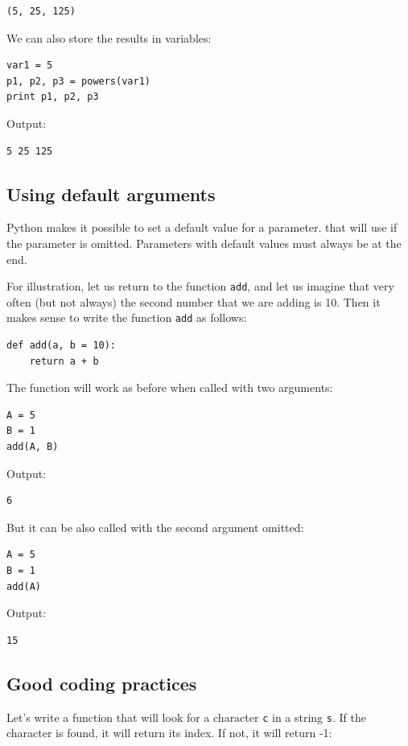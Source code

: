 \begin{verbatim}
(5, 25, 125)
\end{verbatim}
We can also store the results in variables:

\begin{verbatim}
var1 = 5
p1, p2, p3 = powers(var1)
print p1, p2, p3
\end{verbatim}
Output:

\begin{verbatim}
5 25 125
\end{verbatim}

\subsection{Using default arguments}

Python makes it possible to set a default value for a parameter.
that will use if the parameter is omitted. Parameters with 
default values must always be at the end. 

For illustration, let us return to the function {\tt add}, and let us 
imagine that very often (but not always) the second number that we
are adding is 10. Then it makes sense to write the function {\tt add}
as follows:

\begin{verbatim}
def add(a, b = 10):
    return a + b
\end{verbatim}
The function will work as before when called with two arguments: 

\begin{verbatim}
A = 5
B = 1
add(A, B)
\end{verbatim}
Output:
\begin{verbatim}
6
\end{verbatim}
But it can be also called with the second argument omitted:
\begin{verbatim}
A = 5
B = 1
add(A)
\end{verbatim}
Output:
\begin{verbatim}
15
\end{verbatim}

\subsection{Good coding practices}

Let's write a function that will look for a character {\tt c} 
in a string {\tt s}. If the character is found, it will return its index. 
If not, it will return -1:

